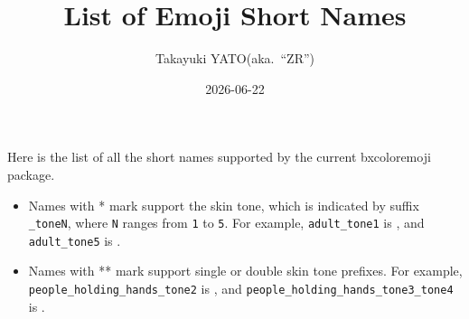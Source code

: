 \documentclass[a4paper]{article}
\title{List of Emoji Short Names}
\author{Takayuki YATO\quad (aka.~``ZR'')}
\date{2026-06-22}
\begin{document}
\maketitle

Here is the list of all the short names supported by
the current bxcoloremoji package.
\begin{itemize}
\item Names with * mark support the skin tone,
  which is indicated by suffix \verb|_toneN|,
  where \texttt{N} ranges from \texttt{1} to \texttt{5}.
  For example,
  \verb|adult_tone1| is , and
  \verb|adult_tone5| is .
\item Names with ** mark support single or double skin tone prefixes.
  For example,
  \verb|people_holding_hands_tone2| is
  , and
  \verb|people_holding_hands_tone3_tone4| is
  .
\end{itemize}

\MakeShortVerb{\!}
\setlength{\tabcolsep}{1em}
\setlength{\arrayrulewidth}{1pt}
\newcommand*{\cHead}[2]{%
  \multicolumn{1}{c}{%
    \raisebox{0pt}[1.2em][0.5em]{\makebox[#1em][c]{%
      \small\bfseries\textcolor{myhead}{#2}}}}}
\newcommand*{\cCE}[1]{%
  \raisebox{-0.2em}[1.2em][0.6em]{%
    \scalebox{1.4}{\coloremojicode{:#1:}}}}
\newcommand*{\cCS}[1]{#1}
\end{document}
